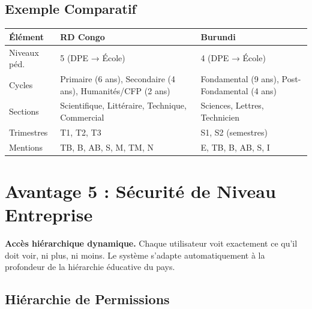 \documentclass[12pt,a4paper,oneside]{report}
\begin{document}
\section{Exemple Comparatif}

\begin{center}
\begin{tabularx}{\textwidth}{l X X}
\toprule
\textbf{Élément} & \textbf{RD Congo} & \textbf{Burundi} \\
\midrule
Niveaux péd. & 5 (DPE → École) & 4 (DPE → École) \\
Cycles & Primaire (6 ans), Secondaire (4 ans), Humanités/CFP (2 ans) & Fondamental (9 ans), Post-Fondamental (4 ans) \\
Sections & Scientifique, Littéraire, Technique, Commercial & Sciences, Lettres, Technicien \\
Trimestres & T1, T2, T3 & S1, S2 (semestres) \\
Mentions & TB, B, AB, S, M, TM, N & E, TB, B, AB, S, I \\
\bottomrule
\end{tabularx}
\end{center}


\chapter{Avantage 5 : Sécurité de Niveau Entreprise}

\begin{avantage}
\textbf{Accès hiérarchique dynamique.} Chaque utilisateur voit exactement ce qu'il doit voir, ni plus, ni moins. Le système s'adapte automatiquement à la profondeur de la hiérarchie éducative du pays.
\end{avantage}

\section{Hiérarchie de Permissions}

\begin{center}
\end{center}
\end{document}
